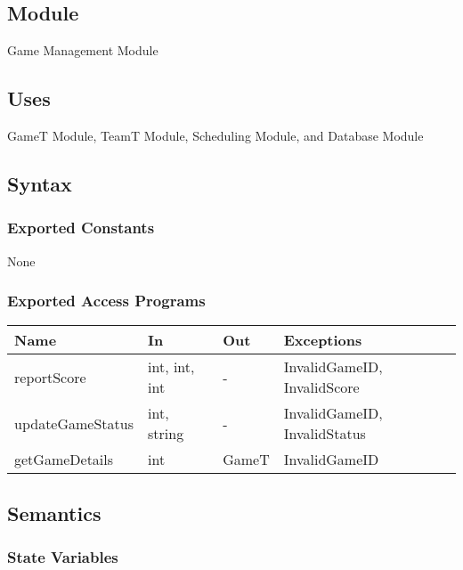 \documentclass[12pt, titlepage]{article}
\begin{document}
\subsection{Module}

Game Management Module

\subsection{Uses}

GameT Module, TeamT Module, Scheduling Module, and Database Module
\subsection{Syntax}

\subsubsection{Exported Constants}

None

\subsubsection{Exported Access Programs}

\begin{center}
  \begin{tabularx}{\textwidth}{|l|X|X|X|}
    \hline
    \textbf{Name}    & \textbf{In}   & \textbf{Out} & \textbf{Exceptions}          \\
    \hline
    reportScore      & int, int, int & -     & InvalidGameID, InvalidScore  \\
    \hline
    updateGameStatus & int, string   & -      & InvalidGameID, InvalidStatus \\
    \hline
    getGameDetails   & int           & GameT        & InvalidGameID                \\
    \hline
  \end{tabularx}
\end{center}



\subsection{Semantics}

\subsubsection{State Variables}
\end{document}
